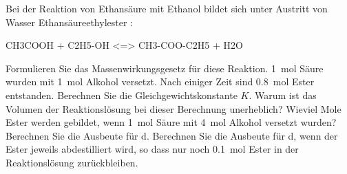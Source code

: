 \documentclass[DIV11]{scrartcl}
\begin{document}
\begin{question}[name=Estersynthese]
Bei der Reaktion von Ethansäure  mit Ethanol  bildet
sich unter Austritt von Wasser Ethansäureethylester :
\begin{reaction*}
 CH3COOH + C2H5-OH <=> CH3-COO-C2H5 + H2O
\end{reaction*}
\begin{tasks}
  \task Formulieren Sie das Massenwirkungsgesetz für diese Reaktion.
  \task \SI{1}{\mole} Säure wurden mit \SI{1}{\mole} Alkohol versetzt.  Nach
    einiger Zeit sind \SI{0.8}{\mole} Ester entstanden. Berechnen Sie die
    Gleichgewichtskonstante $K$.
  \task Warum ist das Volumen der Reaktionslösung bei dieser Berechnung
    unerheblich?
  \task Wieviel Mole Ester werden gebildet, wenn \SI{1}{\mole} Säure mit
    \SI{4}{\mole} Alkohol versetzt wurden?
  \task Berechnen Sie die Ausbeute für d.
  \task Berechnen Sie die Ausbeute für d, wenn der Ester jeweils
    abdestilliert wird, so dass nur noch \SI{0.1}{\mole} Ester in der
    Reaktionslösung zurückbleiben.
\end{tasks}
\end{question}
\end{document}
